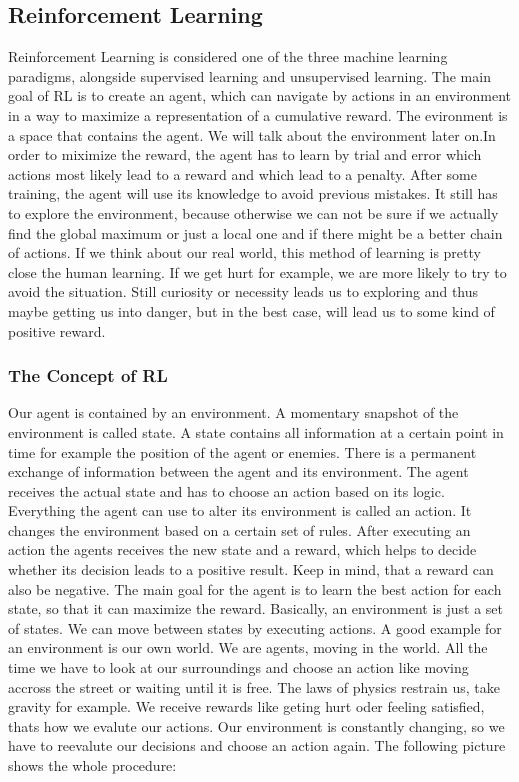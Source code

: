 \subsection{Reinforcement Learning}
	Reinforcement Learning is considered one of the three machine learning paradigms, alongside supervised learning and unsupervised learning. The main goal of RL is to create an agent, which can navigate by actions in an environment in a way to maximize a representation of a cumulative reward. The evironment is a space that contains the agent. We will talk about the environment later on.In order to miximize the reward, the agent has to learn by trial and error which actions most likely lead to a reward and which lead to a penalty. After some training, the agent will use its knowledge to avoid previous mistakes. It still has to explore the environment, because otherwise we can not be sure if we actually find the global maximum or just a local one and if there might be a better chain of actions. If we think about our real world, this method of learning is pretty close the human learning. If we get hurt for example, we are more likely to try to avoid the situation. Still curiosity or necessity leads us to exploring and thus maybe getting us into danger, but in the best case, will lead us to some kind of positive reward.\\
	
	\subsubsection{The Concept of RL}
		Our agent is contained by an environment. A momentary snapshot of the environment is called state. A state contains all information at a certain point in time for example the position of the agent or enemies. There is a permanent exchange of information between the agent and its environment. The agent receives the actual state and has to choose an action based on its logic. Everything the agent can use to alter its environment is called an action. It changes the environment based on a certain set of rules. After executing an action the agents receives the new state and a reward, which helps to decide whether its decision leads to a positive result. Keep in mind, that a reward can also be negative. The main goal for the agent is to learn the best action for each state, so that it can maximize the reward. Basically, an environment is just a set of states. We can move between states by executing actions. A good example for an environment is our own world. We are agents, moving in the world. All the time we have to look at our surroundings and choose an action like moving accross the street or waiting until it is free. The laws of physics restrain us, take gravity for example. We receive rewards like geting hurt oder feeling satisfied, thats how we evalute our actions. Our environment is constantly changing, so we have to reevalute our decisions and choose an action again. The following picture shows the whole procedure:\\ 

